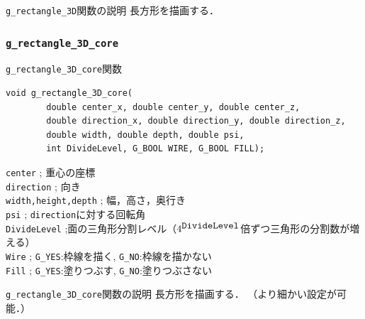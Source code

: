 \documentclass[platex,a4paper,12pt]{jsarticle}%
\begin{document}
\begin{itembox}[l]{\texttt{g\_rectangle\_3D}関数の説明}
長方形を描画する．
\end{itembox}



\clearpage
\subsubsection{\texttt{g\_rectangle\_3D\_core}}

\begin{itembox}[l]{\texttt{g\_rectangle\_3D\_core}関数}
\begin{verbatim}
void g_rectangle_3D_core(
        double center_x, double center_y, double center_z,
        double direction_x, double direction_y, double direction_z,
        double width, double depth, double psi,
        int DivideLevel, G_BOOL WIRE, G_BOOL FILL);
\end{verbatim}
\verb|center| ; 重心の座標\\
\verb|direction| ; 向き\\
\verb|width,height,depth| ; 幅，高さ，奥行き\\
\verb|psi| ; \verb|direction|に対する回転角\\
\verb|DivideLevel| ;面の三角形分割レベル（$4^{\verb|DivideLevel|}$倍ずつ三角形の分割数が増える）\\
\verb|Wire| ; \verb|G_YES|:枠線を描く, \verb|G_NO|:枠線を描かない \\
\verb|Fill| ; \verb|G_YES|:塗りつぶす, \verb|G_NO|:塗りつぶさない 
\end{itembox}

\begin{itembox}[l]{\texttt{g\_rectangle\_3D\_core}関数の説明}
長方形を描画する．
（より細かい設定が可能．）
\end{itembox}
\end{document}
